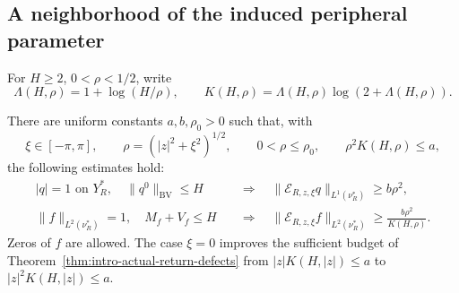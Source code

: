 \subsection{A neighborhood of the induced peripheral parameter}
For $H\ge2$, $0<\rho<1/2$, write
\begin{equation}\label{eq:joint-return-budget}
 \Lambda(H,\rho)=1+\log(H/\rho),\qquad
 K(H,\rho)=\Lambda(H,\rho)\log(2+\Lambda(H,\rho)).
\end{equation}

\begin{theorem}
\label{thm:joint-return-spectral-defect}
There are uniform constants $a,b,\rho_0>0$ such that, with
\begin{equation}\label{eq:joint-return-domain}
 \xi\in[-\pi,\pi],\qquad
 \rho=(|z|^2+\xi^2)^{1/2},\qquad
 0<\rho\le\rho_0,\qquad \rho^2K(H,\rho)\le a,
\end{equation}
the following estimates hold:
\begin{align}
 |q|=1\text{ on }Y_R^*,\quad \|q^0\|_{\mathrm{BV}}\le H
 &\quad\Longrightarrow\quad
 \|\mathcal E_{R,z,\xi}q\|_{L^1(\nu_R^*)}\ge b\rho^2,
                             \label{eq:joint-return-circle}\\
 \|f\|_{L^2(\nu_R^*)}=1,\quad
 M_f+V_f\le H
 &\quad\Longrightarrow\quad
 \|\mathcal E_{R,z,\xi}f\|_{L^2(\nu_R^*)}
                                  \ge\frac{b\rho^2}{K(H,\rho)}.
                             \label{eq:joint-return-vector}
\end{align}
Zeros of $f$ are allowed. The case $\xi=0$ improves the sufficient
budget of Theorem~\ref{thm:intro-actual-return-defects} from
$|z|K(H,|z|)\le a$ to $|z|^2K(H,|z|)\le a$.
\end{theorem}
